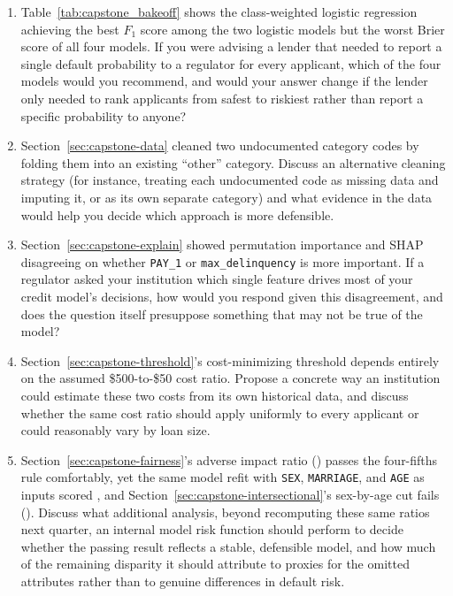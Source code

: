 \documentclass[../ai_in_finance]{subfiles}
\begin{document}
\begin{enumerate}
    \item Table~\ref{tab:capstone_bakeoff} shows the class-weighted logistic regression achieving the best $F_1$ score among the two logistic models but the worst Brier score of all four models. If you were advising a lender that needed to report a single default probability to a regulator for every applicant, which of the four models would you recommend, and would your answer change if the lender only needed to rank applicants from safest to riskiest rather than report a specific probability to anyone?
    \item Section~\ref{sec:capstone-data} cleaned two undocumented category codes by folding them into an existing ``other'' category. Discuss an alternative cleaning strategy (for instance, treating each undocumented code as missing data and imputing it, or as its own separate category) and what evidence in the data would help you decide which approach is more defensible.
    \item Section~\ref{sec:capstone-explain} showed permutation importance and SHAP disagreeing on whether \texttt{PAY\_1} or \texttt{max\_\allowbreak delinquency} is more important. If a regulator asked your institution which single feature drives most of your credit model's decisions, how would you respond given this disagreement, and does the question itself presuppose something that may not be true of the model?
    \item Section~\ref{sec:capstone-threshold}'s cost-minimizing threshold depends entirely on the assumed \$500-to-\$50 cost ratio. Propose a concrete way an institution could estimate these two costs from its own historical data, and discuss whether the same cost ratio should apply uniformly to every applicant or could reasonably vary by loan size.
    \item Section~\ref{sec:capstone-fairness}'s adverse impact ratio (\vChTwentyOneFairAIR) passes the four-fifths rule comfortably, yet the same model refit with \texttt{SEX}, \texttt{MARRIAGE}, and \texttt{AGE} as inputs scored \vChTwentyOneDemoAIR, and Section~\ref{sec:capstone-intersectional}'s sex-by-age cut fails (\vChTwentyOneInterAIR). Discuss what additional analysis, beyond recomputing these same ratios next quarter, an internal model risk function should perform to decide whether the passing result reflects a stable, defensible model, and how much of the remaining disparity it should attribute to proxies for the omitted attributes rather than to genuine differences in default risk.

\end{enumerate}
\end{document}
